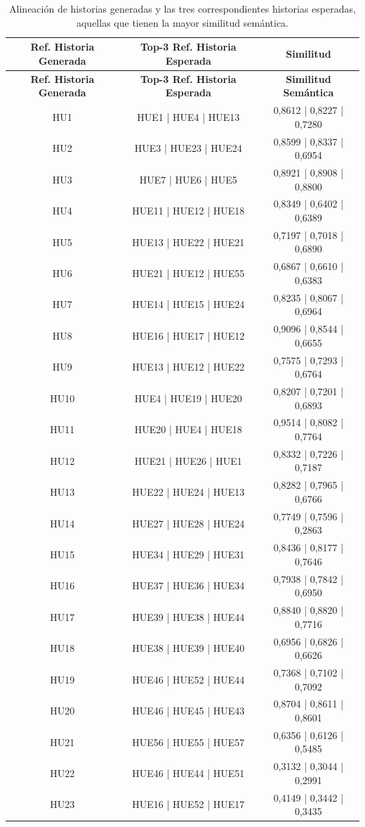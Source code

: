 \documentclass{prgrado}
\begin{document}
\begin{longtable}{|c|c|c|}
\caption{Alineación de historias generadas y las tres correspondientes historias esperadas, aquellas que tienen la mayor similitud semántica.}
\label{tab:alignment_histories} \\
\hline
\textbf{Ref. Historia Generada} & \textbf{Top-3 Ref. Historia Esperada} & \textbf{Similitud} \\
\hline
\endfirsthead

\hline
\textbf{Ref. Historia Generada} & \textbf{Top-3 Ref. Historia Esperada} & \textbf{Similitud Semántica} \\
\hline
\endhead

HU1 & HUE1 | HUE4 | HUE13 & 0,8612 | 0,8227 | 0,7280 \\ \hline
HU2 & HUE3 | HUE23 | HUE24 & 0,8599 | 0,8337 | 0,6954 \\ \hline
HU3 & HUE7 | HUE6 | HUE5 & 0,8921 | 0,8908 | 0,8800 \\ \hline
HU4 & HUE11 | HUE12 | HUE18 & 0,8349 | 0,6402 | 0,6389 \\ \hline
HU5 & HUE13 | HUE22 | HUE21 & 0,7197 | 0,7018 | 0,6890 \\ \hline
HU6 & HUE21 | HUE12 | HUE55 & 0,6867 | 0,6610 | 0,6383 \\ \hline
HU7 & HUE14 | HUE15 | HUE24 & 0,8235 | 0,8067 | 0,6964 \\ \hline
HU8 & HUE16 | HUE17 | HUE12 & 0,9096 | 0,8544 | 0,6655 \\ \hline
HU9 & HUE13 | HUE12 | HUE22 & 0,7575 | 0,7293 | 0,6764 \\ \hline
HU10 & HUE4 | HUE19 | HUE20 & 0,8207 | 0,7201 | 0,6893 \\ \hline
HU11 & HUE20 | HUE4 | HUE18 & 0,9514 | 0,8082 | 0,7764 \\ \hline
HU12 & HUE21 | HUE26 | HUE1 & 0,8332 | 0,7226 | 0,7187 \\ \hline
HU13 & HUE22 | HUE24 | HUE13 & 0,8282 | 0,7965 | 0,6766 \\ \hline
HU14 & HUE27 | HUE28 | HUE24 & 0,7749 | 0,7596 | 0,2863 \\ \hline
HU15 & HUE34 | HUE29 | HUE31 & 0,8436 | 0,8177 | 0,7646 \\ \hline
HU16 & HUE37 | HUE36 | HUE34 & 0,7938 | 0,7842 | 0,6950 \\ \hline
HU17 & HUE39 | HUE38 | HUE44 & 0,8840 | 0,8820 | 0,7716 \\ \hline
HU18 & HUE38 | HUE39 | HUE40 & 0,6956 | 0,6826 | 0,6626 \\ \hline
HU19 & HUE46 | HUE52 | HUE44 & 0,7368 | 0,7102 | 0,7092 \\ \hline
HU20 & HUE46 | HUE45 | HUE43 & 0,8704 | 0,8611 | 0,8601 \\ \hline
HU21 & HUE56 | HUE55 | HUE57 & 0,6356 | 0,6126 | 0,5485 \\ \hline
HU22 & HUE46 | HUE44 | HUE51 & 0,3132 | 0,3044 | 0,2991 \\ \hline
HU23 & HUE16 | HUE52 | HUE17 & 0,4149 | 0,3442 | 0,3435 \\ \hline
\end{longtable}
\end{document}
